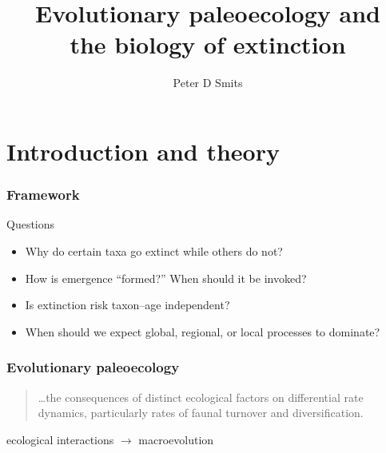 \documentclass{beamer} \usepackage{amsmath,amsthm}
\title{Evolutionary paleoecology and\\ the biology of extinction}
\author{Peter D Smits}
\institute{Committee on Evolutionary Biology, University of Chicago}
\begin{document}
\begin{frame}
  \maketitle
\end{frame}

\begin{frame}
  \tableofcontents
\end{frame}


\section{Introduction and theory}

\begin{frame}
  \frametitle{Framework}

  \begin{alertblock}{Questions}
    \begin{itemize}
      \item Why do certain taxa go extinct while others do not?
      \item How is emergence ``formed?'' When should it be invoked?
      \item Is extinction risk taxon--age independent?
      \item When should we expect global, regional, or local processes to dominate?
    \end{itemize}
  \end{alertblock}
  
\end{frame}

\begin{frame}
  \frametitle{Evolutionary paleoecology}
  \begin{quotation}
    \dots the consequences of distinct ecological factors on differential rate dynamics, particularly rates of faunal turnover and diversification.

    \tiny{}
  \end{quotation}

  \vspace{1.3cm}

  \begin{center}
    ecological interactions \(\rightarrow\) macroevolution
  \end{center}
\end{frame}
\end{document}

